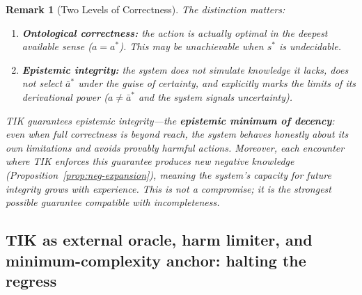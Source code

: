 \documentclass[11pt]{article}
\newtheorem{remark}{Remark}
\begin{document}
\begin{remark}[Two Levels of Correctness]
\label{rem:two-levels}
The distinction matters:
\begin{enumerate}
\item \textbf{Ontological correctness:} the action is \textit{actually optimal}
      in the deepest available sense ($a = a^*$). This may be unachievable
      when $s^*$ is undecidable.
\item \textbf{Epistemic integrity:} the system does not simulate knowledge it
      lacks, does not select $\bar{a}^*$ under the guise of certainty, and
      explicitly marks the limits of its derivational power
      ($a \neq \bar{a}^*$ and the system signals uncertainty).
\end{enumerate}
TIK guarantees \textit{epistemic integrity}---the \textbf{epistemic minimum
of decency}: even when full correctness is beyond reach, the system behaves
honestly about its own limitations and avoids provably harmful actions.
Moreover, each encounter where TIK enforces this guarantee produces new
negative knowledge (Proposition~\ref{prop:neg-expansion}), meaning the
system's capacity for future integrity \textit{grows with experience}. This
is not a compromise; it is the \textit{strongest possible guarantee}
compatible with incompleteness.
\end{remark}


\subsection{TIK as external oracle, harm limiter, and minimum-complexity
anchor: halting the regress}
\end{document}
